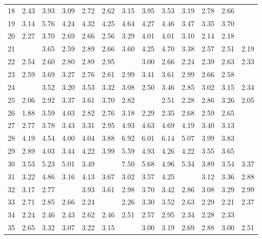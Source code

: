 \begin{tabular}{rrrrrrrrrrrrr}
  18 & 2.43 & 3.93 & 3.09 & 2.72 & 2.62 & 3.15 & 3.95 & 3.53 & 3.19 & 2.78 & 2.66 & \color{blue}{2.34} \\ 
  19 & 3.14 & 5.76 & 4.24 & 4.32 & 4.25 & 4.64 & 4.27 & 4.46 & 3.47 & 3.35 & 3.70 & \color{blue}{3.03} \\ 
  20 & 2.27 & 3.70 & 2.69 & 2.66 & 2.56 & 3.29 & 4.01 & 4.01 & 3.10 & 2.14 & 2.18 & \color{blue}{1.96} \\ 
  21 & \color{blue}{2.04} & 3.65 & 2.59 & 2.89 & 2.66 & 3.60 & 4.25 & 4.70 & 3.38 & 2.57 & 2.51 & 2.19 \\ 
  22 & 2.54 & 2.60 & 2.80 & 2.89 & 2.95 & \color{blue}{1.98} & 3.00 & 2.66 & 2.24 & 2.39 & 2.63 & 2.33 \\ 
  23 & 2.59 & 3.69 & 3.27 & 2.76 & 2.61 & 2.99 & 3.41 & 3.61 & 2.99 & 2.66 & 2.58 & \color{blue}{2.33} \\ 
  24 & \color{blue}{2.09} & 3.52 & 3.20 & 3.53 & 3.32 & 3.08 & 2.50 & 3.46 & 2.85 & 3.02 & 3.15 & 2.34 \\ 
  25 & 2.06 & 2.92 & 3.37 & 3.61 & 3.70 & 2.82 & \color{blue}{1.96} & 2.51 & 2.28 & 2.86 & 3.26 & 2.05 \\ 
  26 & 1.88 & 3.59 & 4.03 & 2.82 & 2.76 & 3.18 & 2.29 & 2.35 & 2.68 & 2.59 & 2.65 & \color{blue}{1.87} \\ 
  27 & 2.77 & 3.78 & 3.43 & 3.31 & 2.95 & 4.93 & 4.63 & 4.69 & 4.19 & 3.40 & 3.13 & \color{blue}{2.48} \\ 
  28 & 4.19 & 4.54 & 4.00 & 4.04 & 3.88 & 6.92 & 6.01 & 6.14 & 5.07 & 3.99 & 3.83 & \color{blue}{3.65} \\ 
  29 & 2.89 & 4.03 & 3.44 & 4.22 & 3.99 & 5.59 & 4.93 & 4.26 & 4.22 & 3.55 & 3.65 & \color{blue}{2.66} \\ 
  30 & 3.53 & 5.23 & 5.01 & 3.49 & \color{blue}{3.37} & 7.50 & 5.68 & 4.96 & 5.34 & 3.89 & 3.54 & 3.37 \\ 
  31 & 3.22 & 4.86 & 3.16 & 4.13 & 3.67 & 3.02 & 3.57 & 4.25 & \color{blue}{2.85} & 3.12 & 3.36 & 2.88 \\ 
  32 & 3.17 & 2.77 & \color{blue}{2.63} & 3.93 & 3.61 & 2.98 & 3.70 & 3.42 & 2.86 & 3.08 & 3.29 & 2.99 \\ 
  33 & 2.71 & 2.85 & 2.66 & 2.24 & \color{blue}{2.18} & 2.26 & 3.30 & 3.52 & 2.63 & 2.29 & 2.21 & 2.37 \\ 
  34 & 2.24 & 2.46 & 2.43 & 2.62 & 2.46 & 2.51 & 2.57 & 2.95 & 2.34 & 2.28 & 2.33 & \color{blue}{2.16} \\ 
  35 & 2.65 & 3.32 & 3.07 & 3.22 & 3.15 & \color{blue}{2.41} & 3.00 & 3.19 & 2.69 & 2.88 & 3.00 & 2.51 \\ 

\end{tabular}
